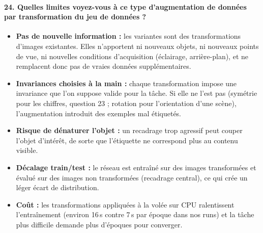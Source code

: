 \documentclass{report}
\begin{document}
\paragraph{24. Quelles limites voyez-vous à ce type d'augmentation de données par transformation du jeu de données ?}
 \begin{itemize}
    \item \textbf{Pas de nouvelle information :} les variantes sont des transformations d'images existantes. Elles n'apportent ni nouveaux objets, ni nouveaux points de vue, ni nouvelles conditions d'acquisition (éclairage, arrière-plan), et ne remplacent donc pas de vraies données supplémentaires.
    \item \textbf{Invariances choisies à la main :} chaque transformation impose une invariance que l'on suppose valide pour la tâche. Si elle ne l'est pas (symétrie pour les chiffres, question 23 ; rotation pour l'orientation d'une scène), l'augmentation introduit des exemples mal étiquetés.
    \item \textbf{Risque de dénaturer l'objet :} un recadrage trop agressif peut couper l'objet d'intérêt, de sorte que l'étiquette ne correspond plus au contenu visible.
    \item \textbf{Décalage train/test :} le réseau est entraîné sur des images transformées et évalué sur des images non transformées (recadrage central), ce qui crée un léger écart de distribution.
    \item \textbf{Coût :} les transformations appliquées à la volée sur CPU ralentissent l'entraînement (environ 16\,s contre 7\,s par époque dans nos runs) et la tâche plus difficile demande plus d'époques pour converger.
\end{itemize}
\end{document}
